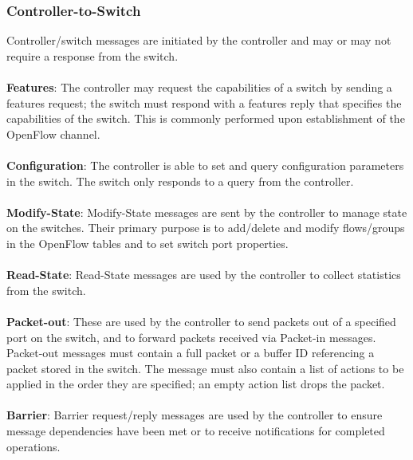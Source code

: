 \documentclass[10pt]{article}
\begin{document}
\subsubsection{Controller-to-Switch}
Controller/switch messages are initiated by the controller and may or may not require a response from the switch.
\\\\
\textbf{Features}:  The controller may request the capabilities of a switch by sending a features request; the switch must respond with a features reply that specifies the capabilities of the switch. This is commonly performed upon establishment of the OpenFlow channel.
\\\\
\textbf{Configuration}: The controller is able to set and query configuration parameters in the switch.  The switch only responds to a query from the controller.
\\\\
\textbf{Modify-State}: Modify-State messages are sent by the controller to manage state on the switches.  Their primary purpose is to add/delete and modify flows/groups in the OpenFlow tables and to set switch port properties.
\\\\
\textbf{Read-State}: Read-State messages are used by the controller to collect statistics from the switch.
\\\\
\textbf{Packet-out}:  These are used by the controller to send packets out of a specified port on the switch, and to forward packets received via Packet-in messages. Packet-out messages must contain a full packet or a buffer ID referencing a packet stored in the switch. The message must also contain a list of actions to be applied in the order they are specified; an empty action list drops the packet.
\\\\
\textbf{Barrier}: Barrier request/reply messages are used by the controller to ensure message dependencies have been met or to receive notifications for completed operations.  
\end{document}

